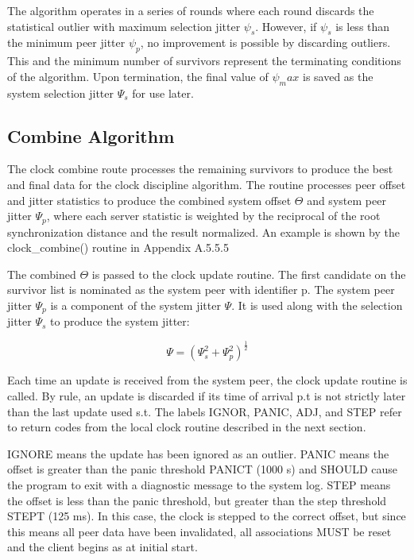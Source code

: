 The algorithm operates in a series of rounds where each round
discards the statistical outlier with maximum selection jitter $ \psi_s $.
However, if $ \psi_s $ is less than the minimum peer jitter $ \psi_p $, no
improvement is possible by discarding outliers. This and the minimum
number of survivors represent the terminating conditions of the
algorithm. Upon termination, the final value of $ \psi_max $ is saved as
the system selection jitter $ \Psi_s $ for use later.

\subsection{Combine Algorithm}
\label{section-11-2-3}

The clock combine route processes the remaining survivors to produce
the best and final data for the clock discipline algorithm. The
routine processes peer offset and jitter statistics to produce the
combined system offset $ \Theta $ and system peer jitter $ \Psi_p $, where each
server statistic is weighted by the reciprocal of the root
synchronization distance and the result normalized. An example is
shown by the clock\_combine() routine in Appendix A.5.5.5

The combined $ \Theta $ is passed to the clock update routine. The first
candidate on the survivor list is nominated as the system peer with
identifier p. The system peer jitter $ \Psi_p $ is a component of the
system jitter $ \Psi $. It is used along with the selection jitter $ \Psi_s $
to produce the system jitter:

$$
\Psi = \left( \Psi_s^2 + \Psi_p^2 \right)^{\frac{1}{2}}
$$

Each time an update is received from the system peer, the clock
update routine is called. By rule, an update is discarded if its
time of arrival p.t is not strictly later than the last update used
s.t. The labels IGNOR, PANIC, ADJ, and STEP refer to return codes
from the local clock routine described in the next section.

IGNORE means the update has been ignored as an outlier. PANIC means
the offset is greater than the panic threshold PANICT (1000 s) and
SHOULD cause the program to exit with a diagnostic message to the
system log. STEP means the offset is less than the panic threshold,
but greater than the step threshold STEPT (125 ms). In this case,
the clock is stepped to the correct offset, but since this means all
peer data have been invalidated, all associations MUST be reset and
the client begins as at initial start.

